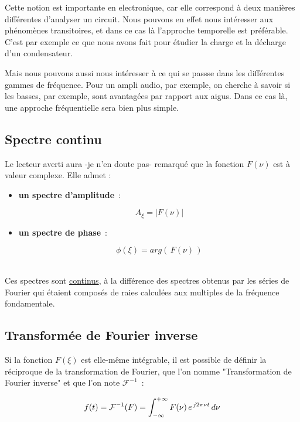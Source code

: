 Cette notion est importante en electronique, car elle correspond à deux manières différentes d'analyser un circuit. Nous pouvons en effet nous intéresser aux phénomènes transitoires, et dans ce cas là l'approche temporelle est préférable. C'est par exemple ce que nous avons fait pour étudier la charge et la décharge d'un condensateur.

Mais nous pouvons aussi nous intéresser à ce qui se passse dans les différentes gammes de fréquence. Pour un ampli audio, par exemple, on cherche à savoir si les basses, par exemple, sont avantagées par rapport aux aigus. Dans ce cas là, une approche fréquentielle sera bien plus simple.

\subsection*{Spectre continu}

Le lecteur averti aura -je n'en doute pas- remarqué que la fonction $F(\nu)$ est à valeur complexe. Elle admet : \\

\begin{itemize}
	\item \textbf{un spectre d'amplitude}~:  

		$$A_\xi = \lvert F(\nu) \rvert $$ 

	\item \textbf{un spectre de phase}~: 

		$$\phi(\xi) = arg(\,F(\nu)\,)$$ \\

\end{itemize}

Ces spectres sont \underline{continus}, à la différence des spectres obtenus par les séries de Fourier qui étaient composés de raies calculées aux multiples de la fréquence fondamentale.

\subsection*{Transformée de Fourier inverse }

Si la fonction $F(\xi)$ est elle-même intégrable, il est possible de définir la réciproque de la transformation de Fourier, que l'on nomme "Transformation de Fourier inverse" et que l'on note $\mathcal{F}^{-1}$~:

\begin{equation*}
	f(t) = \mathcal{F}^{-1}(F)=\int_{-\infty}^{+\infty}F(\nu)\,e^{\,j2\pi\nu t}\,d\nu \\
\end{equation*}


